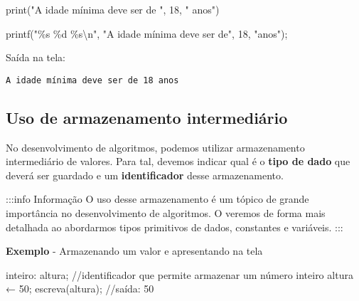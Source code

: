 \documentclass[
  letterpaper,
  DIV=11,
  numbers=noendperiod]{scrreprt}
\newenvironment{Shaded}{\begin{snugshade}}{\end{snugshade}}
\newcommand{\BuiltInTok}[1]{\textcolor[rgb]{0.00,0.23,0.31}{#1}}
\newcommand{\CommentTok}[1]{\textcolor[rgb]{0.37,0.37,0.37}{#1}}
\newcommand{\DecValTok}[1]{\textcolor[rgb]{0.68,0.00,0.00}{#1}}
\newcommand{\NormalTok}[1]{\textcolor[rgb]{0.00,0.23,0.31}{#1}}
\newcommand{\OperatorTok}[1]{\textcolor[rgb]{0.37,0.37,0.37}{#1}}
\newcommand{\SpecialCharTok}[1]{\textcolor[rgb]{0.37,0.37,0.37}{#1}}
\newcommand{\StringTok}[1]{\textcolor[rgb]{0.13,0.47,0.30}{#1}}
\begin{document}
\begin{Shaded}
\begin{Highlighting}[]
\BuiltInTok{print}\NormalTok{(}\StringTok{"A idade mínima deve ser de "}\NormalTok{, }\DecValTok{18}\NormalTok{, }\StringTok{" anos"}\NormalTok{)}
\end{Highlighting}
\end{Shaded}

\begin{Shaded}
\begin{Highlighting}[]
\NormalTok{printf}\OperatorTok{(}\StringTok{"}\SpecialCharTok{\%s}\StringTok{ }\SpecialCharTok{\%d}\StringTok{ }\SpecialCharTok{\%s\textbackslash{}n}\StringTok{"}\OperatorTok{,} \StringTok{"A idade mínima deve ser de"}\OperatorTok{,} \DecValTok{18}\OperatorTok{,} \StringTok{"anos"}\OperatorTok{);}
\end{Highlighting}
\end{Shaded}

Saída na tela:

\begin{verbatim}
A idade mínima deve ser de 18 anos
\end{verbatim}

\subsection{Uso de armazenamento
intermediário}\label{uso-de-armazenamento-intermediuxe1rio}

No desenvolvimento de algoritmos, podemos utilizar armazenamento
intermediário de valores. Para tal, devemos indicar qual é o
\textbf{tipo de dado} que deverá ser guardado e um
\textbf{identificador} desse armazenamento.

:::info Informação O uso desse armazenamento é um tópico de grande
importância no desenvolvimento de algoritmos. O veremos de forma mais
detalhada ao abordarmos tipos primitivos de dados, constantes e
variáveis. :::

\textbf{Exemplo} - Armazenando um valor e apresentando na tela

\begin{Shaded}
\begin{Highlighting}[]
\NormalTok{inteiro}\OperatorTok{:}\NormalTok{ altura}\OperatorTok{;} \CommentTok{//identificador que permite armazenar um número inteiro}
\NormalTok{altura ← }\DecValTok{50}\OperatorTok{;}
\NormalTok{escreva}\OperatorTok{(}\NormalTok{altura}\OperatorTok{);} \CommentTok{//saída: 50}
\end{Highlighting}
\end{Shaded}
\end{document}
